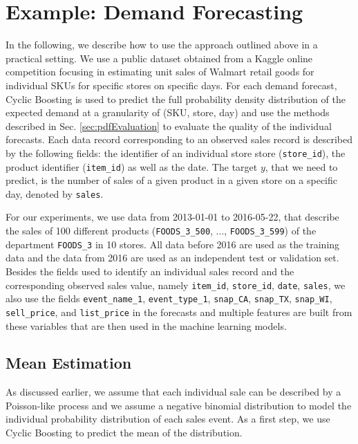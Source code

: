 \documentclass[BCOR=1mm, DIV=calc,10pt,
twoside=true,
twocolumn,
headings=normal]{scrartcl}
\begin{document}
\section{Example: Demand Forecasting}
\label{sec:example}

In the following, we describe how to use the approach outlined above in a practical setting. We use a public dataset obtained from a Kaggle online competition focusing in estimating unit sales of Walmart retail goods \cite{kaggle_data} for individual SKUs for specific stores on specific days. For each demand forecast, Cyclic Boosting is used to predict the full probability density distribution of the expected demand at a granularity of (SKU, store, day) and use the methods described in Sec. \ref{sec:pdfEvaluation} to evaluate the quality of the individual forecasts. Each data record corresponding to an observed sales record is described by the following fields: the identifier of an individual store store (\texttt{store\_id}), the product identifier (\texttt{item\_id}) as well as the date. The target $y$, that we need to predict, is the number of sales of a given product in a given store on a specific day, denoted by \texttt{sales}.

For our experiments, we use data from 2013-01-01 to 2016-05-22, that describe the sales of 100 different products (\texttt{FOODS\_3\_500}, ..., \texttt{FOODS\_3\_599}) of the department \texttt{FOODS\_3} in 10 stores.  All data before 2016 are used as the training data and the data from 2016 are used as an independent test or validation set. Besides the fields used to identify an individual sales record and the corresponding observed sales value, namely \texttt{item\_id}, \texttt{store\_id}, \texttt{date}, \texttt{sales}, we also use the fields \texttt{event\_name\_1}, \texttt{event\_type\_1}, \texttt{snap\_CA}, \texttt{snap\_TX}, \texttt{snap\_WI}, \texttt{sell\_price}, and \texttt{list\_price} in the forecasts and multiple features are built from these variables that are then used in the machine learning models.

\subsection{Mean Estimation}
\label{sec:example_mean}

As discussed earlier, we assume that each individual sale can be described by a Poisson-like process and we assume a negative binomial distribution to model the individual probability distribution of each sales event. As a first step, we use Cyclic Boosting to predict the mean of the distribution.
\end{document}
